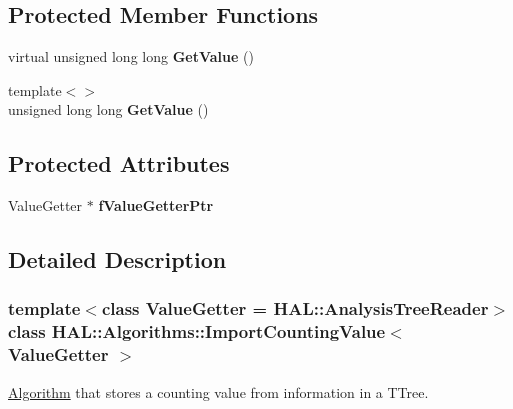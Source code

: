 \subsection*{Protected Member Functions}
\begin{DoxyCompactItemize}
\item 
\hypertarget{class_h_a_l_1_1_algorithms_1_1_import_counting_value_ae56b3039650722c791d2635039937f59}{virtual unsigned long long {\bfseries Get\+Value} ()}\label{class_h_a_l_1_1_algorithms_1_1_import_counting_value_ae56b3039650722c791d2635039937f59}

\item 
\hypertarget{class_h_a_l_1_1_algorithms_1_1_import_counting_value_a55d90364aba22128a661036ee6554b08}{{\footnotesize template$<$$>$ }\\unsigned long long {\bfseries Get\+Value} ()}\label{class_h_a_l_1_1_algorithms_1_1_import_counting_value_a55d90364aba22128a661036ee6554b08}

\end{DoxyCompactItemize}
\subsection*{Protected Attributes}
\begin{DoxyCompactItemize}
\item 
\hypertarget{class_h_a_l_1_1_algorithms_1_1_import_counting_value_ab93d369be3c197cadce57e1d5eb8a47e}{Value\+Getter $\ast$ {\bfseries f\+Value\+Getter\+Ptr}}\label{class_h_a_l_1_1_algorithms_1_1_import_counting_value_ab93d369be3c197cadce57e1d5eb8a47e}

\end{DoxyCompactItemize}


\subsection{Detailed Description}
\subsubsection*{template$<$class Value\+Getter = H\+A\+L\+::\+Analysis\+Tree\+Reader$>$class H\+A\+L\+::\+Algorithms\+::\+Import\+Counting\+Value$<$ Value\+Getter $>$}

\hyperlink{class_h_a_l_1_1_algorithm}{Algorithm} that stores a counting value from information in a T\+Tree. 

